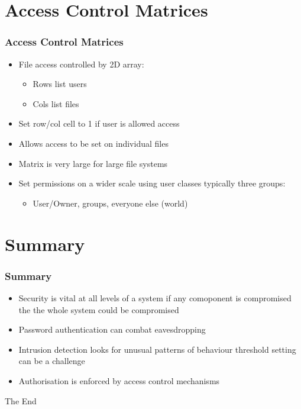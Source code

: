 \documentclass{beamer}
\begin{document}
\section{Access Control Matrices}
\begin{frame}
\frametitle{Access Control Matrices}
\begin{itemize}
\item File access controlled by 2D array:
\begin{itemize}
\item Rows list users
\item Cols list files
\end{itemize}
\item Set row/col cell to 1 if user is allowed access
\item Allows access to be set on individual files
\item Matrix is very large for large file systems
\item Set permissions on a wider scale using user classes typically three groups:
\begin{itemize}
\item User/Owner, groups, everyone else (world)
\end{itemize}
\end{itemize}
\end{frame}
\section{Summary}
\begin{frame}
\frametitle{Summary}
\begin{itemize}
\item Security is vital at all levels of a system if any comoponent is compromised the the whole system could be compromised
\item Password authentication can combat eavesdropping
\item Intrusion detection looks for unusual patterns of behaviour threshold setting can be a challenge
\item Authorisation is enforced by access control mechanisms
\end{itemize}
\end{frame}

\begin{frame} 
\Huge{\centerline{The End}}
\end{frame}
\end{document}
